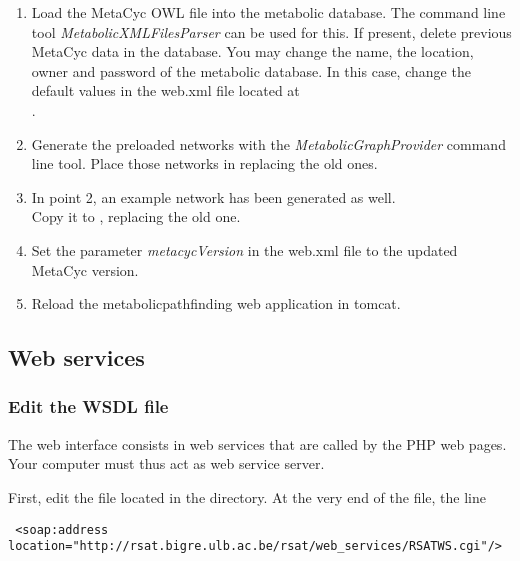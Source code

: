 \documentclass{book}
\begin{document}
\begin{enumerate}

\item Load the MetaCyc OWL file into the metabolic database.
      The command line tool \textit{MetabolicXMLFilesParser} can be used for this.
      If present, delete previous MetaCyc data in the database. You may change the name,
      the location, owner and password of the metabolic database. In this case, change the
      default values in the web.xml file located at\\
      .

\item Generate the preloaded networks with the \textit{MetabolicGraphProvider} command line tool.
      Place those networks in  replacing the old ones.

\item In point 2, an example network has been generated as well.\\
      Copy it to
      , replacing the old one.

\item Set the parameter \textit{metacycVersion} in the web.xml file to the updated MetaCyc version.

\item Reload the metabolicpathfinding web application in tomcat.

\end{enumerate}

\subsection{Web services}

\subsubsection{Edit the WSDL file}
The web interface consists in web services that are called by the PHP web pages. Your computer must thus act as web service server.

First, edit the file  located in the
 directory.
At the very end of the file, the line

\begin{footnotesize}
\begin{verbatim}
 <soap:address location="http://rsat.bigre.ulb.ac.be/rsat/web_services/RSATWS.cgi"/>
\end{verbatim}
\end{footnotesize}
\end{document}
